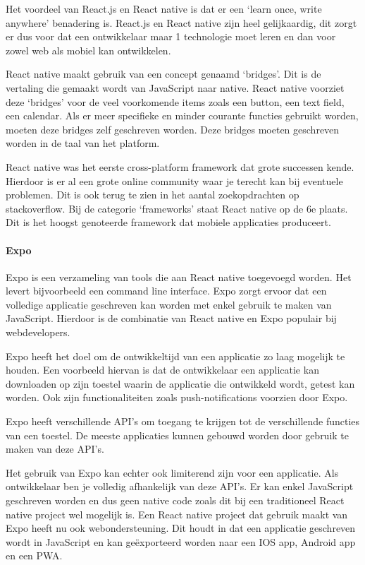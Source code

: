 		Het voordeel van React.js en React native is dat er een ‘learn once, write anywhere’ benadering is. React.js en React native zijn heel gelijkaardig, dit zorgt er dus voor dat een ontwikkelaar maar 1 technologie moet leren en dan voor zowel web als mobiel kan ontwikkelen.
		
		React native maakt gebruik van een concept genaamd ‘bridges’. Dit is de vertaling die gemaakt wordt van JavaScript naar native. React native voorziet deze ‘bridges’ voor de veel voorkomende items zoals een button, een text field, een calendar. Als er meer specifieke en minder courante functies gebruikt worden, moeten deze bridges zelf geschreven worden. Deze bridges moeten geschreven worden in de taal van het platform. 
		\autocite{Bartosz2019}
		
		React native was het eerste cross-platform framework dat grote successen kende. Hierdoor is er al een grote online community waar je terecht kan bij eventuele problemen. Dit is ook terug te zien in het aantal zoekopdrachten op stackoverflow. Bij de categorie ‘frameworks’ staat React native op de 6e plaats. Dit is het hoogst genoteerde framework dat mobiele applicaties produceert.
		\autocite{StackOverflow2020}
		
		
		\paragraph{Expo}
			Expo is een verzameling van tools die aan React native toegevoegd worden. Het levert bijvoorbeeld een command line interface. Expo zorgt ervoor dat een volledige applicatie geschreven kan worden met enkel gebruik te maken van JavaScript. Hierdoor is de combinatie van React native en Expo populair bij webdevelopers.
			
			Expo heeft het doel om de ontwikkeltijd van een applicatie zo laag mogelijk te houden. Een voorbeeld hiervan is dat de ontwikkelaar een applicatie kan downloaden op zijn toestel waarin de applicatie die ontwikkeld wordt, getest kan worden. Ook zijn functionaliteiten zoals push-notifications voorzien door Expo.
			
			Expo heeft verschillende API’s om toegang te krijgen tot de verschillende functies van een toestel. De meeste applicaties kunnen gebouwd worden door gebruik te maken van deze API’s. 
			
			Het gebruik van Expo kan echter ook limiterend zijn voor een applicatie. Als ontwikkelaar ben je volledig afhankelijk van deze API’s. Er kan enkel JavaScript geschreven worden en dus geen native code zoals dit bij een traditioneel React native project wel mogelijk is.
			Een React native project dat gebruik maakt van Expo heeft nu ook webondersteuning. Dit houdt in dat een applicatie geschreven wordt in JavaScript en kan geëxporteerd worden naar een IOS app, Android app en een PWA.
			
